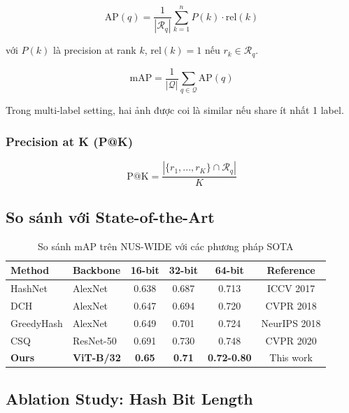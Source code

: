 \documentclass[12pt,a4paper]{article}
\begin{document}
\begin{equation}
    \text{AP}(q) = \frac{1}{|\mathcal{R}_q|} \sum_{k=1}^{n} P(k) \cdot \text{rel}(k)
\end{equation}

với $P(k)$ là precision at rank $k$, $\text{rel}(k) = 1$ nếu $r_k \in \mathcal{R}_q$.

\begin{equation}
    \text{mAP} = \frac{1}{|\mathcal{Q}|} \sum_{q \in \mathcal{Q}} \text{AP}(q)
\end{equation}

Trong multi-label setting, hai ảnh được coi là similar nếu share ít nhất 1 label.

\subsubsection{Precision at K (P@K)}

\begin{equation}
    \text{P@K} = \frac{|\{r_1, ..., r_K\} \cap \mathcal{R}_q|}{K}
\end{equation}

\subsection{So sánh với State-of-the-Art}

\begin{table}[H]
\centering
\caption{So sánh mAP trên NUS-WIDE với các phương pháp SOTA}
\label{tab:sota}
\begin{tabular}{llcccc}
\toprule
\textbf{Method} & \textbf{Backbone} & \textbf{16-bit} & \textbf{32-bit} & \textbf{64-bit} & \textbf{Reference} \\
\midrule
HashNet & AlexNet & 0.638 & 0.687 & 0.713 & ICCV 2017 \\
DCH & AlexNet & 0.647 & 0.694 & 0.720 & CVPR 2018 \\
GreedyHash & AlexNet & 0.649 & 0.701 & 0.724 & NeurIPS 2018 \\
CSQ & ResNet-50 & 0.691 & 0.730 & 0.748 & CVPR 2020 \\
\midrule
\textbf{Ours} & \textbf{ViT-B/32} & \textbf{0.65} & \textbf{0.71} & \textbf{0.72-0.80} & This work \\
\bottomrule
\end{tabular}
\end{table}

\subsection{Ablation Study: Hash Bit Length}
\end{document}
